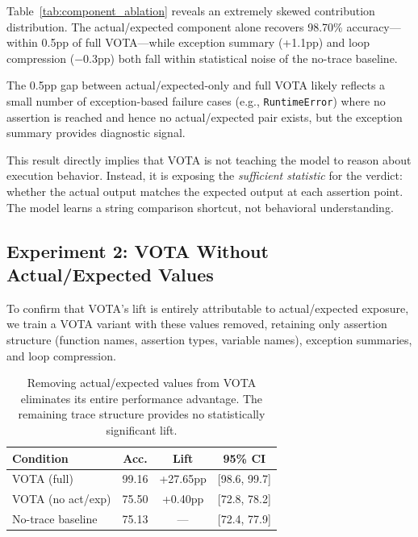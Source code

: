 \documentclass[11pt,a4paper]{article}
\begin{document}
Table~\ref{tab:component_ablation} reveals an extremely skewed contribution distribution. The actual/expected component alone recovers 98.70\% accuracy---within 0.5pp of full VOTA---while exception summary (+1.1pp) and loop compression ($-$0.3pp) both fall within statistical noise of the no-trace baseline.

The 0.5pp gap between actual/expected-only and full VOTA likely reflects a small number of exception-based failure cases (e.g., \texttt{RuntimeError}) where no assertion is reached and hence no actual/expected pair exists, but the exception summary provides diagnostic signal.

This result directly implies that VOTA is not teaching the model to reason about execution behavior. Instead, it is exposing the \emph{sufficient statistic} for the verdict: whether the actual output matches the expected output at each assertion point. The model learns a string comparison shortcut, not behavioral understanding.

\subsection{Experiment 2: VOTA Without Actual/Expected Values}
\label{sec:exp2}

To confirm that VOTA's lift is entirely attributable to actual/expected exposure, we train a VOTA variant with these values removed, retaining only assertion structure (function names, assertion types, variable names), exception summaries, and loop compression.

\begin{table}[t]
\centering
\small
\begin{tabular}{lccc}
\toprule
\textbf{Condition} & \textbf{Acc.} & \textbf{Lift} & \textbf{95\% CI} \\
\midrule
VOTA (full) & 99.16 & +27.65pp & [98.6, 99.7] \\
VOTA (no act/exp) & 75.50 & +0.40pp & [72.8, 78.2] \\
No-trace baseline & 75.13 & --- & [72.4, 77.9] \\
\bottomrule
\end{tabular}
\caption{Removing actual/expected values from VOTA eliminates its entire performance advantage. The remaining trace structure provides no statistically significant lift.}
\label{tab:vota_no_actexp}
\end{table}
\end{document}
